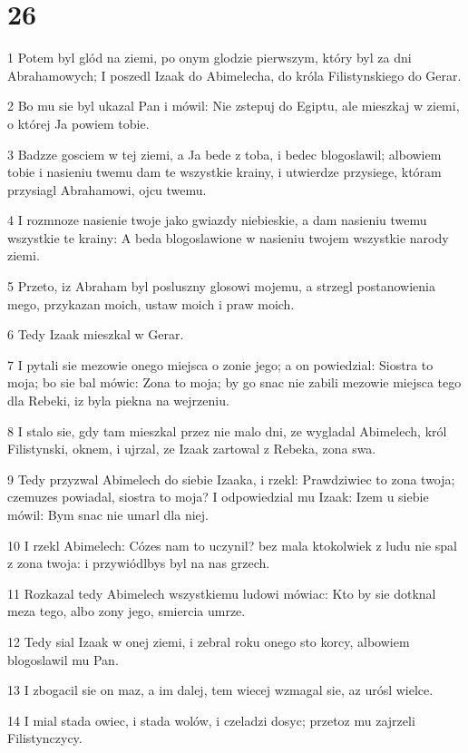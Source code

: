 \chapter{26}

\par 1 Potem byl glód na ziemi, po onym glodzie pierwszym, który byl za dni Abrahamowych; I poszedl Izaak do Abimelecha, do króla Filistynskiego do Gerar.
\par 2 Bo mu sie byl ukazal Pan i mówil: Nie zstepuj do Egiptu, ale mieszkaj w ziemi, o której Ja powiem tobie.
\par 3 Badzze gosciem w tej ziemi, a Ja bede z toba, i bedec blogoslawil; albowiem tobie i nasieniu twemu dam te wszystkie krainy, i utwierdze przysiege, któram przysiagl Abrahamowi, ojcu twemu.
\par 4 I rozmnoze nasienie twoje jako gwiazdy niebieskie, a dam nasieniu twemu wszystkie te krainy: A beda blogoslawione w nasieniu twojem wszystkie narody ziemi.
\par 5 Przeto, iz Abraham byl posluszny glosowi mojemu, a strzegl postanowienia mego, przykazan moich, ustaw moich i praw moich.
\par 6 Tedy Izaak mieszkal w Gerar.
\par 7 I pytali sie mezowie onego miejsca o zonie jego; a on powiedzial: Siostra to moja; bo sie bal mówic: Zona to moja; by go snac nie zabili mezowie miejsca tego dla Rebeki, iz byla piekna na wejrzeniu.
\par 8 I stalo sie, gdy tam mieszkal przez nie malo dni, ze wygladal Abimelech, król Filistynski, oknem, i ujrzal, ze Izaak zartowal z Rebeka, zona swa.
\par 9 Tedy przyzwal Abimelech do siebie Izaaka, i rzekl: Prawdziwiec to zona twoja; czemuzes powiadal, siostra to moja? I odpowiedzial mu Izaak: Izem u siebie mówil: Bym snac nie umarl dla niej.
\par 10 I rzekl Abimelech: Cózes nam to uczynil? bez mala ktokolwiek z ludu nie spal z zona twoja: i przywiódlbys byl na nas grzech.
\par 11 Rozkazal tedy Abimelech wszystkiemu ludowi mówiac: Kto by sie dotknal meza tego, albo zony jego, smiercia umrze.
\par 12 Tedy sial Izaak w onej ziemi, i zebral roku onego sto korcy, albowiem blogoslawil mu Pan.
\par 13 I zbogacil sie on maz, a im dalej, tem wiecej wzmagal sie, az urósl wielce.
\par 14 I mial stada owiec, i stada wolów, i czeladzi dosyc; przetoz mu zajrzeli Filistynczycy.
